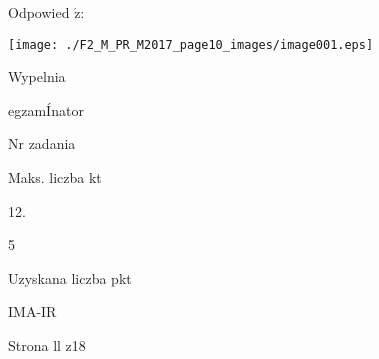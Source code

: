 \documentclass[a4paper,12pt]{article}
\begin{document}
Odpowied $\acute{\mathrm{z}}$:
\begin{center}
\texttt{[image: ./F2\_M\_PR\_M2017\_page10\_images/image001.eps]}
\end{center}
Wypelnia

egzamÍnator

Nr zadania

Maks. liczba kt

12.

5

Uzyskana liczba pkt

IMA-IR

Strona ll z18
\end{document}
